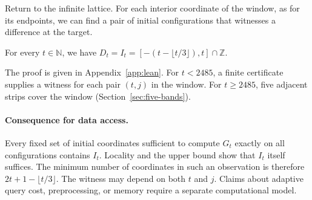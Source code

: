 Return to the infinite lattice. For each interior coordinate of the window, as for its endpoints, we can find a pair of initial configurations that witnesses a difference at the target.

\begin{theorem}\label{thm:gap-free}
For every $t \in \mathbb{N}$, we have $D_t = I_t = [-(t - \lfloor t/3 \rfloor), t] \cap \mathbb{Z}$.
\end{theorem}

The proof is given in Appendix~\ref{app:lean}. For $t<2485$, a finite certificate supplies a witness for each pair $(t,j)$ in the window. For $t\ge2485$, five adjacent strips cover the window (Section~\ref{sec:five-bands}).

\paragraph{Consequence for data access.}
Every fixed set of initial coordinates sufficient to compute $G_t$ exactly on all configurations contains $I_t$. Locality and the upper bound show that $I_t$ itself suffices. The minimum number of coordinates in such an observation is therefore $2t+1-\lfloor t/3\rfloor$. The witness may depend on both $t$ and $j$. Claims about adaptive query cost, preprocessing, or memory require a separate computational model.
